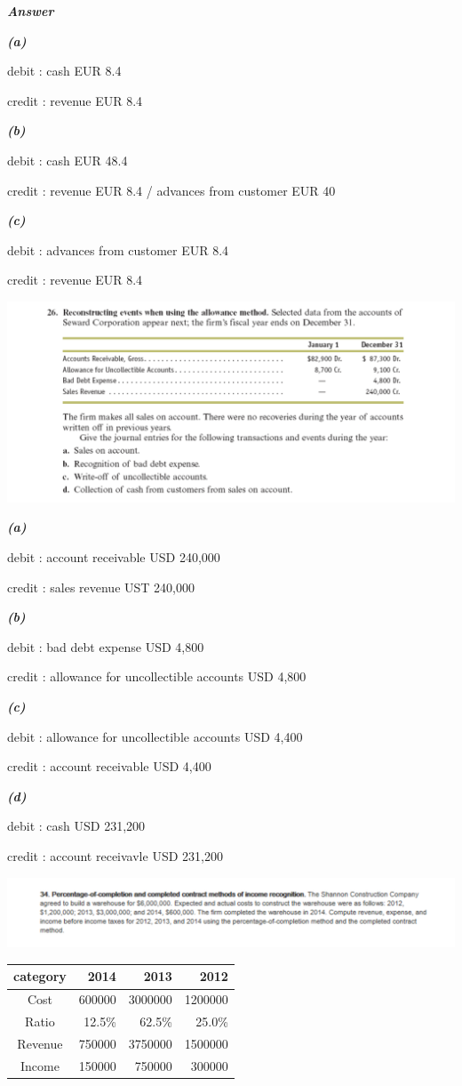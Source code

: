 \documentclass[
  a4paper,
  DIV=11,
  numbers=noendperiod]{scrreprt}
\begin{document}
\textbf{\emph{Answer}}

\textbf{\emph{(a)}}

debit : cash EUR 8.4

credit : revenue EUR 8.4

\textbf{\emph{(b)}}

debit : cash EUR 48.4

credit : revenue EUR 8.4 / advances from customer EUR 40

\textbf{\emph{(c)}}

debit : advances from customer EUR 8.4

credit : revenue EUR 8.4

\includegraphics{images/재무회계8-26.png}

\textbf{\emph{(a)}}

debit : account receivable USD 240,000

credit : sales revenue UST 240,000

\textbf{\emph{(b)}}

debit : bad debt expense USD 4,800

credit : allowance for uncollectible accounts USD 4,800

\textbf{\emph{(c)}}

debit : allowance for uncollectible accounts USD 4,400

credit : account receivable USD 4,400

\textbf{\emph{(d)}}

debit : cash USD 231,200

credit : account receivavle USD 231,200

\includegraphics{images/재무회계8-34.png}

\begin{longtable}[]{@{}crrr@{}}
\toprule\noalign{}
category & 2014 & 2013 & 2012 \\
\midrule\noalign{}
\endhead
\bottomrule\noalign{}
\endlastfoot
Cost & 600000 & 3000000 & 1200000 \\
Ratio & 12.5\% & 62.5\% & 25.0\% \\
Revenue & 750000 & 3750000 & 1500000 \\
Income & 150000 & 750000 & 300000 \\
\end{longtable}
\end{document}
